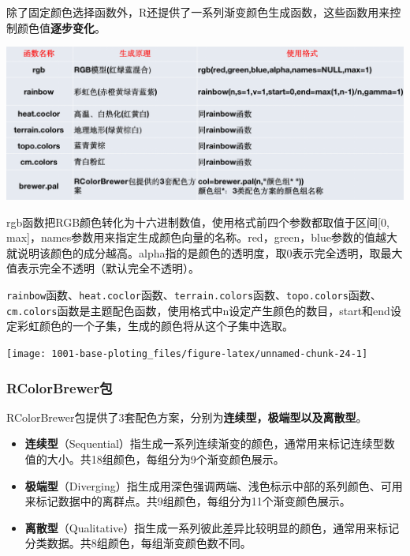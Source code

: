 \documentclass[
]{book}
\begin{document}
除了固定颜色选择函数外，R还提供了一系列渐变颜色生成函数，这些函数用来控制颜色值\textbf{逐步变化}。

\includegraphics{figure/14.png}

rgb函数把RGB颜色转化为十六进制数值，使用格式前四个参数都取值于区间{[}0, max{]}，names参数用来指定生成颜色向量的名称。red，green，blue参数的值越大就说明该颜色的成分越高。alpha指的是颜色的透明度，取0表示完全透明，取最大值表示完全不透明（默认完全不透明）。

\texttt{rainbow}函数、\texttt{heat.coclor}函数、\texttt{terrain.colors}函数、\texttt{topo.colors}函数、\texttt{cm.colors}函数是主题配色函数，使用格式中n设定产生颜色的数目，start和end设定彩虹颜色的一个子集，生成的颜色将从这个子集中选取。

\begin{center}\texttt{[image: 1001-base-ploting\_files/figure-latex/unnamed-chunk-24-1]} \end{center}

\hypertarget{rcolorbrewerux5305}{%
\subsubsection{RColorBrewer包}\label{rcolorbrewerux5305}}

RColorBrewer包提供了3套配色方案，分别为\textbf{连续型，极端型以及离散型}。

\begin{itemize}
\item
  \textbf{连续型}（Sequential）指生成一系列连续渐变的颜色，通常用来标记连续型数值的大小。共18组颜色，每组分为9个渐变颜色展示。
\item
  \textbf{极端型}（Diverging）指生成用深色强调两端、浅色标示中部的系列颜色、可用来标记数据中的离群点。共9组颜色，每组分为11个渐变颜色展示。
\item
  \textbf{离散型}（Qualitative）指生成一系列彼此差异比较明显的颜色，通常用来标记分类数据。共8组颜色，每组渐变颜色数不同。
\end{itemize}
\end{document}

